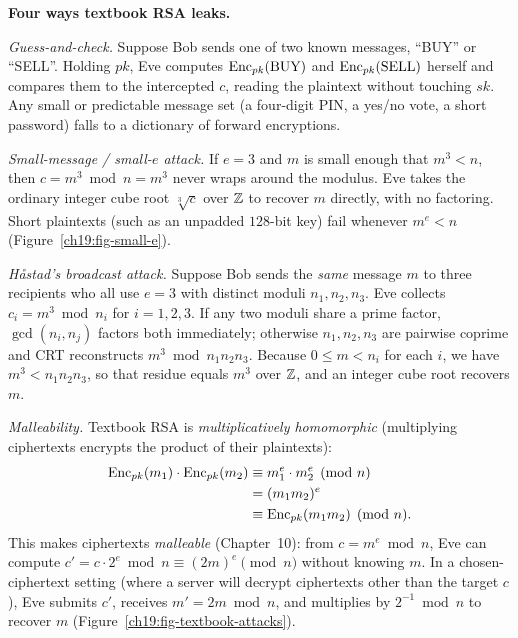 \begin{attackbox}
\textbf{Four ways textbook RSA leaks.}

\emph{Guess-and-check.} Suppose Bob sends one of two known messages, ``BUY'' or ``SELL''. Holding $pk$, Eve computes $\operatorname{Enc}_{pk}(\text{BUY})$ and $\operatorname{Enc}_{pk}(\text{SELL})$ herself and compares them to the intercepted $c$, reading the plaintext without touching $sk$. Any small or predictable message set (a four-digit PIN, a yes/no vote, a short password) falls to a dictionary of forward encryptions.


\emph{Small-message / small-$e$ attack.} If $e=3$ and $m$ is small enough that $m^3 < n$, then $c = m^3 \bmod n = m^3$ never wraps around the modulus. Eve takes the ordinary integer cube root $\sqrt[3]{c}$ over $\mathbb{Z}$ to recover $m$ directly, with no factoring. Short plaintexts (such as an unpadded $128$-bit key) fail whenever $m^e < n$ (Figure~\ref{ch19:fig-small-e}).

\emph{H\r{a}stad's broadcast attack.} Suppose Bob sends the \emph{same} message $m$ to three recipients who all use $e=3$ with distinct moduli $n_1,n_2,n_3$. Eve collects $c_i = m^3\bmod n_i$ for $i=1,2,3$. If any two moduli share a prime factor, $\gcd(n_i, n_j)$ factors both immediately; otherwise $n_1, n_2, n_3$ are pairwise coprime and CRT reconstructs $m^3 \bmod n_1 n_2 n_3$. Because $0 \le m < n_i$ for each $i$, we have $m^3 < n_1 n_2 n_3$, so that residue equals $m^3$ over $\mathbb{Z}$, and an integer cube root recovers $m$.

\emph{Malleability.} Textbook RSA is \emph{multiplicatively homomorphic} (multiplying ciphertexts encrypts the product of their plaintexts):
\begin{align*}
  \operatorname{Enc}_{pk}(m_1)\cdot\operatorname{Enc}_{pk}(m_2) &\equiv m_1^e \cdot m_2^e \pmod n \\
                                    &= (m_1 m_2)^e \\
                                    &\equiv \operatorname{Enc}_{pk}(m_1 m_2) \pmod n.
\end{align*}
This makes ciphertexts \emph{malleable} (Chapter~10): from $c = m^e \bmod n$, Eve can compute $c' = c\cdot 2^e\bmod n \equiv (2m)^e \pmod n$ without knowing $m$. In a chosen-ciphertext setting (where a server will decrypt ciphertexts other than the target $c$), Eve submits $c'$, receives $m' = 2m \bmod n$, and multiplies by $2^{-1} \bmod n$ to recover $m$ (Figure~\ref{ch19:fig-textbook-attacks}).
\end{attackbox}
